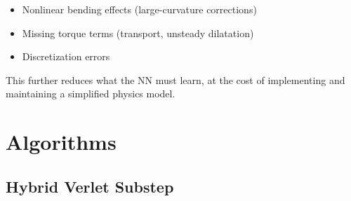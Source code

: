 \documentclass[11pt]{article}
\begin{document}
\begin{itemize}
  \item Nonlinear bending effects (large-curvature corrections)
  \item Missing torque terms (transport, unsteady dilatation)
  \item Discretization errors
\end{itemize}

\noindent
This further reduces what the NN must learn, at the cost of implementing and maintaining a simplified physics model.


\section{Algorithms}
\label{sec:algorithms}

\subsection{Hybrid Verlet Substep}
\end{document}
